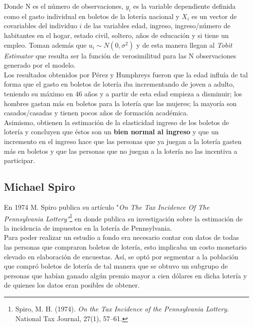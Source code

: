 Donde N es el número de observaciones, $y_i$ es la variable dependiente definida como el gasto individual en boletos de la lotería nacional y $X_i$ es un vector de covariables del individuo $i$ de las variables edad, ingreso, ingreso/número de habitantes en el hogar, estado civil, soltero, años de educación y si tiene un empleo. Toman además que $u_i \sim N(0, \sigma^2)$ y de esta manera llegan al \textit{Tobit Estimator} que resulta ser la función de verosimilitud para las N observaciones generado por el modelo. \\

Los resultados obtenidos por Pérez y Humphreys fueron que la edad influía de tal forma que el gasto en boletos de lotería iba incrementando de joven a adulto, teniendo su máximo en 46 años y a partir de esta edad empieza a disminuir; los hombres gastan más en boletos para la lotería que las mujeres; la mayoría son casados/casadas y tienen pocos años de formación académica. \\

Asimismo, obtienen la estimación de la elasticidad ingreso de los boletos de lotería y concluyen que éstos son un \textbf{bien normal al ingreso} y que un incremento en el ingreso hace que las personas que ya juegan a la lotería gasten más en boletos y que las personas que no juegan a la lotería no las incentiva a participar.

\newpage

\subsection{Michael Spiro}

En 1974 M. Spiro publica su artículo "\textit{On The Tax Incidence Of The Pennsylvania Lottery"}\footnote{Spiro, M. H. (1974). \textit{On the Tax Incidence of the Pennsylvania Lottery}. National Tax Journal, 27(1), 57–61.} en donde publica su investigación sobre la estimación de la incidencia de impuestos en la lotería de Pennsylvania. \\

Para poder realizar un estudio a fondo era necesario contar con datos de todas las personas que compraron boletos de lotería, esto implicaba un costo monetario elevado en elaboración de encuestas. Así, se optó por segmentar a la población que compró boletos de lotería de tal manera que se obtuvo un subgrupo de personas que habían ganado algún premio mayor a cien dólares en dicha lotería y de quienes los datos eran posibles de obtener. \\

